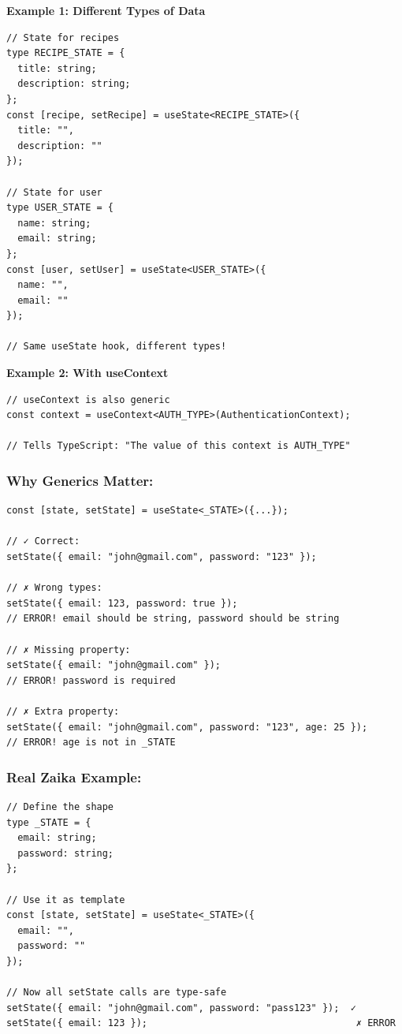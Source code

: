 \documentclass[12pt]{article}
\begin{document}
\textbf{Example 1: Different Types of Data}

\begin{lstlisting}
// State for recipes
type RECIPE_STATE = {
  title: string;
  description: string;
};
const [recipe, setRecipe] = useState<RECIPE_STATE>({
  title: "",
  description: ""
});

// State for user
type USER_STATE = {
  name: string;
  email: string;
};
const [user, setUser] = useState<USER_STATE>({
  name: "",
  email: ""
});

// Same useState hook, different types!
\end{lstlisting}

\textbf{Example 2: With useContext}

\begin{lstlisting}
// useContext is also generic
const context = useContext<AUTH_TYPE>(AuthenticationContext);

// Tells TypeScript: "The value of this context is AUTH_TYPE"
\end{lstlisting}

\subsubsection*{Why Generics Matter:}

\begin{lstlisting}
const [state, setState] = useState<_STATE>({...});

// ✓ Correct:
setState({ email: "john@gmail.com", password: "123" });

// ✗ Wrong types:
setState({ email: 123, password: true });  
// ERROR! email should be string, password should be string

// ✗ Missing property:
setState({ email: "john@gmail.com" });
// ERROR! password is required

// ✗ Extra property:
setState({ email: "john@gmail.com", password: "123", age: 25 });
// ERROR! age is not in _STATE
\end{lstlisting}

\subsubsection*{Real Zaika Example:}

\begin{lstlisting}
// Define the shape
type _STATE = {
  email: string;
  password: string;
};

// Use it as template
const [state, setState] = useState<_STATE>({ 
  email: "", 
  password: "" 
});

// Now all setState calls are type-safe
setState({ email: "john@gmail.com", password: "pass123" });  ✓
setState({ email: 123 });                                     ✗ ERROR
\end{lstlisting}
\end{document}

